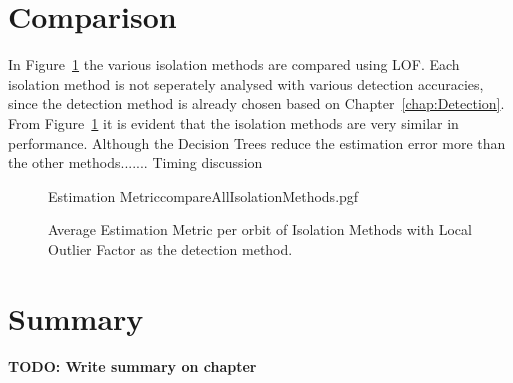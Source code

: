%	

%	

\section{Comparison}
In Figure~\ref{fig:IsolationComparison} the various isolation methods are compared using LOF. Each isolation method is not seperately analysed with various detection accuracies, since the detection method is already chosen based on Chapter~\ref{chap:Detection}. From Figure~\ref{fig:IsolationComparison} it is evident that the isolation methods are very similar in performance. Although the Decision Trees reduce the estimation error more than the other methods....... Timing discussion

\begin{figure}[!htb]
	\centering
	{Estimation MetriccompareAllIsolationMethods.pgf}
	
	\caption{Average Estimation Metric per orbit of Isolation Methods with Local Outlier Factor as the detection method.}
	\label{fig:IsolationComparison}
\end{figure}

%	

\section{Summary}
\textbf{TODO: Write summary on chapter}